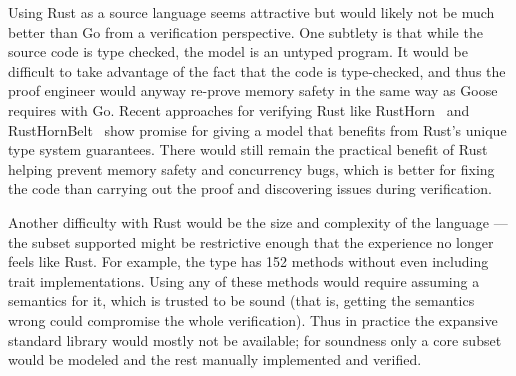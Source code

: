 Using Rust as a source language seems attractive but would likely not be much
better than Go from a verification perspective. One subtlety is that while the source code is type checked, the
model is an untyped program. It would be difficult to take advantage of the fact
that the code is type-checked, and thus the proof engineer would anyway
re-prove memory safety in the same way as Goose requires with Go. Recent approaches for verifying Rust like
RustHorn~\cite{matsushita:rusthorn} and
RustHornBelt~\cite{matsushita:rusthornbelt} show promise for giving a model that
benefits from Rust's unique type system guarantees. There would
still remain the practical benefit of Rust helping prevent memory safety and
concurrency bugs, which is better for fixing the code than carrying out the
proof and discovering issues during verification.

Another difficulty with Rust would be the size and complexity of the language
--- the subset supported might be restrictive enough that the experience no
longer feels like Rust. For example, the  type has 152 methods
without even including trait implementations. Using any of these methods would
require assuming a semantics for it, which is trusted to be sound (that is,
getting the semantics wrong could compromise the whole verification). Thus in
practice the expansive standard library would mostly not be available; for
soundness only a core subset would be modeled and the rest manually implemented
and verified.
